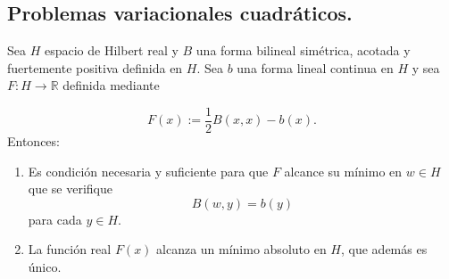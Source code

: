 \subsection{Problemas variacionales cuadráticos.}

\begin{theorem}
  \label{th:prob-var-cuad}
  Sea $H$ espacio de Hilbert real y $B$ una forma bilineal simétrica, acotada y
  fuertemente positiva definida en $H$. Sea $b$ una forma lineal continua en $H$ 
  y sea $F:H\to \mathbb{R}$ definida mediante

  \[
  F(x):=\frac{1}{2}B(x,x)-b(x)
  .\] 
  Entonces:
  \begin{enumerate}
    \item Es condición necesaria y suficiente para que $F$ alcance su mínimo en
      $w \in H$ que se verifique
      \[
        B(w,y)=b(y)
      \] 
      para cada $y\in H$.

    \item La función real $F(x)$ alcanza un mínimo absoluto en $H$, que además
      es único.
  \end{enumerate}
\end{theorem}
